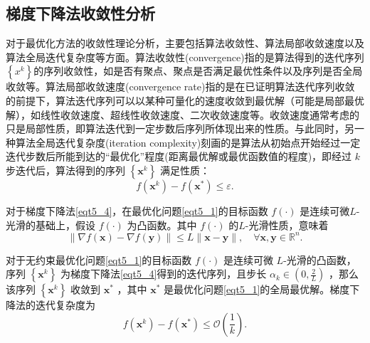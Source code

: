 \subsection{梯度下降法收敛性分析}
对于最优化方法的收敛性理论分析，主要包括算法收敛性、算法局部收敛速度以及算法全局迭代复杂度等方面\cite{2002ConvergenceAnalysis}。算法收敛性(convergence)指的是算法得到的迭代序列$\left\{x^{k}\right\}$的序列收敛性，如是否有聚点、聚点是否满足最优性条件以及序列是否全局收敛等。算法局部收敛速度(convergence rate)指的是在已证明算法迭代序列收敛的前提下，算法迭代序列可以以某种可量化的速度收敛到最优解（可能是局部最优解），如线性收敛速度、超线性收敛速度、二次收敛速度等。收敛速度通常考虑的只是局部性质，即算法迭代到一定步数后序列所体现出来的性质。与此同时，另一种算法全局迭代复杂度(iteration complexity)刻画的是算法从初始点开始经过一定迭代步数后所能到达的“最优化”程度(距离最优解或最优函数值的程度)，即经过 $k$ 步迭代后，算法得到的序列 $\left\{\bm{x}^{k}\right\}$ 满足性质：
\begin{equation}
    f\left(\bm{x}^{k}\right)-f\left(\bm{x}^{*}\right) \leq \varepsilon .
    \label{eqt5_5}
\end{equation}
\par 对于梯度下降法\ref{eqt5_4}，在最优化问题\ref{eqt5_1}的目标函数 $f(\cdot)$ 是连续可微$L$-光滑的基础上，假设 $f(\cdot)$ 为凸函数。其中 $f(\cdot)$ 的$L$-光滑性质，意味着
\begin{equation}
    \|\nabla f(\bm{x})-\nabla f(\bm{y})\| \leq L\|\bm{x}-\bm{y}\|, \quad \forall \bm{x}, \bm{y} \in \mathbb{R}^{n} .
    \nonumber
\end{equation}

\begin{theorem}[收敛性]\label{thm1}
    对于无约束最优化问题\ref{eqt5_1}的目标函数 $f(\cdot)$ 是连续可微 $L$-光滑的凸函数，序列 $\left\{\bm{x}^{k}\right\}$ 为梯度下降法\ref{eqt5_4}得到的迭代序列，且步长 $\alpha_{k} \in\left(0, \frac{2}{L}\right)$ ，那么该序列 $\left\{\bm{x}^{k}\right\}$ 收敛到 $\bm{x}^{*}$ ，其中  $\bm{x}^{*}$ 是最优化问题\ref{eqt5_1}的全局最优解。梯度下降法的迭代复杂度为
    \begin{equation}
        f\left(\bm{x}^{k}\right)-f\left(\bm{x}^{*}\right) \leq \mathcal{O}\left(\frac{1}{k}\right) .
        \nonumber
    \end{equation}
\end{theorem}

